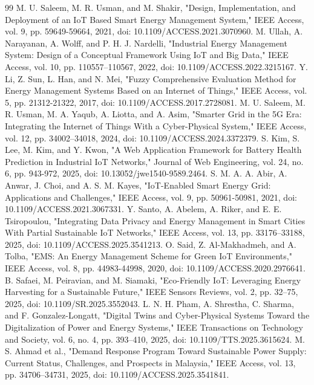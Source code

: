 \documentclass{ieeeaccess}
\begin{document}
\begin{thebibliography}{99}
 M. U. Saleem, M. R. Usman, and M. Shakir, "Design, Implementation, and Deployment of an IoT Based Smart Energy Management System," IEEE Access, vol. 9, pp. 59649-59664, 2021, doi: 10.1109/ACCESS.2021.3070960.
 M. Ullah, A. Narayanan, A. Wolff, and P. H. J. Nardelli, "Industrial Energy Management System: Design of a Conceptual Framework Using IoT and Big Data," IEEE Access, vol. 10, pp. 110557--110567, 2022, doi: 10.1109/ACCESS.2022.3215167.
 Y. Li, Z. Sun, L. Han, and N. Mei, "Fuzzy Comprehensive Evaluation Method for Energy Management Systems Based on an Internet of Things," IEEE Access, vol. 5, pp. 21312-21322, 2017, doi: 10.1109/ACCESS.2017.2728081.
 M. U. Saleem, M. R. Usman, M. A. Yaqub, A. Liotta, and A. Asim, "Smarter Grid in the 5G Era: Integrating the Internet of Things With a Cyber-Physical System," IEEE Access, vol. 12, pp. 34002--34018, 2024, doi: 10.1109/ACCESS.2024.3372379.
 S. Kim, S. Lee, M. Kim, and Y. Kwon, "A Web Application Framework for Battery Health Prediction in Industrial IoT Networks," Journal of Web Engineering, vol. 24, no. 6, pp. 943-972, 2025, doi: 10.13052/jwe1540-9589.2464.
 S. M. A. A. Abir, A. Anwar, J. Choi, and A. S. M. Kayes, "IoT-Enabled Smart Energy Grid: Applications and Challenges," IEEE Access, vol. 9, pp. 50961-50981, 2021, doi: 10.1109/ACCESS.2021.3067331.
 Y. Santo, A. Abelem, A. Riker, and E. E. Tsiropoulou, "Integrating Data Privacy and Energy Management in Smart Cities With Partial Sustainable IoT Networks," IEEE Access, vol. 13, pp. 33176--33188, 2025, doi: 10.1109/ACCESS.2025.3541213.
 O. Said, Z. Al-Makhadmeh, and A. Tolba, "EMS: An Energy Management Scheme for Green IoT Environments," IEEE Access, vol. 8, pp. 44983-44998, 2020, doi: 10.1109/ACCESS.2020.2976641.
 B. Safaei, M. Peiravian, and M. Siamaki, "Eco-Friendly IoT: Leveraging Energy Harvesting for a Sustainable Future," IEEE Sensors Reviews, vol. 2, pp. 32--75, 2025, doi: 10.1109/SR.2025.3552043.
 L. N. H. Pham, A. Shrestha, C. Sharma, and F. Gonzalez-Longatt, "Digital Twins and Cyber-Physical Systems Toward the Digitalization of Power and Energy Systems," IEEE Transactions on Technology and Society, vol. 6, no. 4, pp. 393--410, 2025, doi: 10.1109/TTS.2025.3615624.
 M. S. Ahmad et al., "Demand Response Program Toward Sustainable Power Supply: Current Status, Challenges, and Prospects in Malaysia," IEEE Access, vol. 13, pp. 34706--34731, 2025, doi: 10.1109/ACCESS.2025.3541841.

\end{thebibliography}
\end{document}
